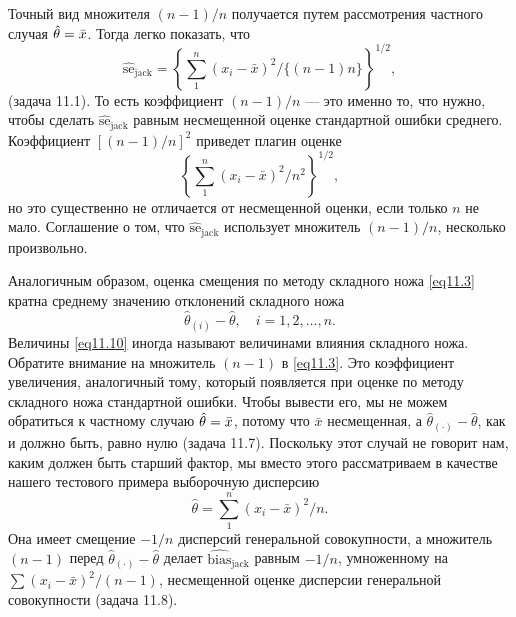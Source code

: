 Точный вид множителя $(n-1)/n$ получается путем рассмотрения частного случая $\hat{\theta} = \Bar{x}$. Тогда легко показать, что
\begin{equation}\label{eq11.8}
   \widehat{\text{se}}_{\text{jack}} = \left\{\sum\limits_{1}^{n}(x_i-\bar{x})^2/\{(n-1)n\}\right\}^{1/2},
\end{equation}
(задача 11.1). То есть коэффициент $(n-1)/n$ --- это именно то, что нужно, чтобы сделать $\widehat{\text{se}}_{\text{jack}}$ равным несмещенной оценке стандартной ошибки среднего. Коэффициент $[(n-1)/n]^2$ приведет плагин оценке
\begin{equation}\label{eq11.9}
   \left\{\sum\limits_{1}^{n}(x_i-\bar{x})^2/n^{2}\right\}^{1/2},
\end{equation}
но это существенно не отличается от несмещенной оценки, если только $n$ не мало. Соглашение о том, что $\widehat{\text{se}}_{\text{jack}}$ использует множитель $(n-1)/n$,  несколько произвольно.

Аналогичным образом, оценка смещения по методу складного ножа \ref{eq11.3} кратна среднему значению отклонений складного ножа
\begin{equation}\label{eq11.10}
   \hat{\theta}_{(i)} - \hat{\theta}, \quad i = 1, 2, \dots, n.
\end{equation}
Величины \ref{eq11.10} иногда называют величинами влияния складного ножа. Обратите внимание на множитель $(n-1)$ в \ref{eq11.3}. Это коэффициент увеличения, аналогичный тому, который появляется при оценке по методу складного ножа стандартной ошибки. Чтобы вывести его, мы не можем обратиться к частному случаю $\hat{\theta} = \Bar{x}$, потому что $\bar{x}$ несмещенная, а $\hat{\theta}_{(\cdot)} - \hat{\theta}$, как и должно быть, равно нулю (задача 11.7). Поскольку этот случай не говорит нам, каким должен быть старший фактор, мы вместо этого рассматриваем в качестве нашего тестового примера выборочную дисперсию
\begin{equation}\label{eq11.11}
   \hat{\theta} = \sum\limits_{1}^{n}(x_{i}-\bar{x})^{2}/n.
\end{equation}
Она имеет смещение $-1/n$ дисперсий генеральной совокупности, а множитель $(n-1)$ перед $\hat{\theta}_{(\cdot)} - \hat{\theta}$ делает $\widehat{\text{bias}}_{\text{jack}}$ равным $-1/n$, умноженному на $\sum(x_i-\bar{x})^2/(n-1)$, несмещенной оценке дисперсии генеральной совокупности (задача 11.8).
